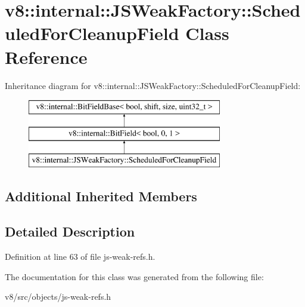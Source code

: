 \hypertarget{classv8_1_1internal_1_1JSWeakFactory_1_1ScheduledForCleanupField}{}\section{v8\+:\+:internal\+:\+:J\+S\+Weak\+Factory\+:\+:Scheduled\+For\+Cleanup\+Field Class Reference}
\label{classv8_1_1internal_1_1JSWeakFactory_1_1ScheduledForCleanupField}
Inheritance diagram for v8\+:\+:internal\+:\+:J\+S\+Weak\+Factory\+:\+:Scheduled\+For\+Cleanup\+Field\+:\begin{figure}[H]
\begin{center}
\leavevmode
\includegraphics[height=3.000000cm]{classv8_1_1internal_1_1JSWeakFactory_1_1ScheduledForCleanupField}
\end{center}
\end{figure}
\subsection*{Additional Inherited Members}


\subsection{Detailed Description}


Definition at line 63 of file js-\/weak-\/refs.\+h.



The documentation for this class was generated from the following file\+:\begin{DoxyCompactItemize}
\item 
v8/src/objects/js-\/weak-\/refs.\+h\end{DoxyCompactItemize}
